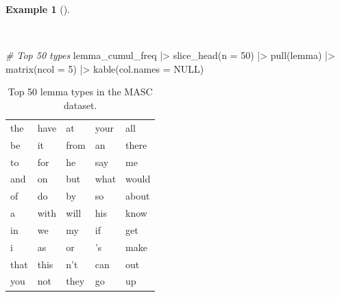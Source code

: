 \documentclass[
  letterpaper,
]{book}
\newenvironment{Shaded}{\begin{snugshade}}{\end{snugshade}}
\newcommand{\AttributeTok}[1]{\textcolor[rgb]{0.00,0.00,0.00}{#1}}
\newcommand{\CommentTok}[1]{\textcolor[rgb]{0.00,0.00,0.00}{\textit{#1}}}
\newcommand{\ConstantTok}[1]{\textcolor[rgb]{0.00,0.00,0.00}{#1}}
\newcommand{\DecValTok}[1]{\textcolor[rgb]{0.00,0.00,0.00}{#1}}
\newcommand{\FunctionTok}[1]{\textcolor[rgb]{0.00,0.00,0.00}{#1}}
\newcommand{\NormalTok}[1]{\textcolor[rgb]{0.00,0.00,0.00}{#1}}
\newcommand{\SpecialCharTok}[1]{\textcolor[rgb]{0.00,0.00,0.00}{#1}}
\theoremstyle{definition}
\newtheorem{example}{Example}[chapter]
\theoremstyle{remark}
\begin{document}
\begin{example}[]\protect\hypertarget{exm-explore-masc-count-top-50}{}\label{exm-explore-masc-count-top-50}

~

\begin{Shaded}
\begin{Highlighting}[]
\CommentTok{\# Top 50 types}
\NormalTok{lemma\_cumul\_freq }\SpecialCharTok{|\textgreater{}}
  \FunctionTok{slice\_head}\NormalTok{(}\AttributeTok{n =} \DecValTok{50}\NormalTok{) }\SpecialCharTok{|\textgreater{}}
  \FunctionTok{pull}\NormalTok{(lemma) }\SpecialCharTok{|\textgreater{}}
  \FunctionTok{matrix}\NormalTok{(}\AttributeTok{ncol =} \DecValTok{5}\NormalTok{) }\SpecialCharTok{|\textgreater{}}
  \FunctionTok{kable}\NormalTok{(}\AttributeTok{col.names =} \ConstantTok{NULL}\NormalTok{)}
\end{Highlighting}
\end{Shaded}

\begin{longtable}[]{@{}
  >{\raggedright\arraybackslash}p{}
  >{\raggedright\arraybackslash}p{}
  >{\raggedright\arraybackslash}p{}
  >{\raggedright\arraybackslash}p{}
  >{\raggedright\arraybackslash}p{}@{}}

\caption{\label{tbl-explore-masc-count-top-50}Top 50 lemma types in the
MASC dataset.}

\tabularnewline

\toprule\noalign{}
\endhead
\bottomrule\noalign{}
\endlastfoot
the & have & at & your & all \\
be & it & from & an & there \\
to & for & he & say & me \\
and & on & but & what & would \\
of & do & by & so & about \\
a & with & will & his & know \\
in & we & my & if & get \\
i & as & or & 's & make \\
that & this & n't & can & out \\
you & not & they & go & up \\

\end{longtable}

\end{example}
\end{document}
